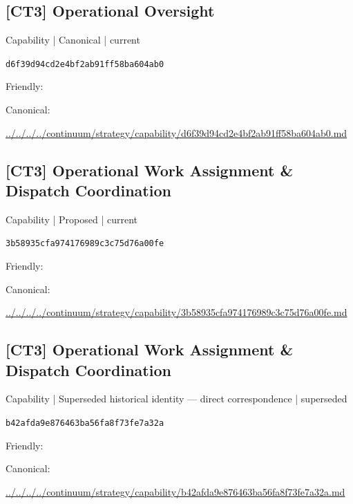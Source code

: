 \documentclass[10pt,a4paper]{article}
\begin{document}
\subsection*{[CT3] Operational Oversight}
{\small Capability | Canonical | current}\par
\texttt{d6f39d94cd2e4bf2ab91ff58ba604ab0}\par
Friendly: \par
Canonical: \par
{\footnotesize\url{../../../../continuum/strategy/capability/d6f39d94cd2e4bf2ab91ff58ba604ab0.md}}\par
\subsection*{[CT3] Operational Work Assignment \& Dispatch Coordination}
{\small Capability | Proposed | current}\par
\texttt{3b58935cfa974176989c3c75d76a00fe}\par
Friendly: \par
Canonical: \par
{\footnotesize\url{../../../../continuum/strategy/capability/3b58935cfa974176989c3c75d76a00fe.md}}\par
\subsection*{[CT3] Operational Work Assignment \& Dispatch Coordination}
{\small Capability | Superseded historical identity — direct correspondence | superseded}\par
\texttt{b42afda9e876463ba56fa8f73fe7a32a}\par
Friendly: \par
Canonical: \par
{\footnotesize\url{../../../../continuum/strategy/capability/b42afda9e876463ba56fa8f73fe7a32a.md}}\par
\end{document}

